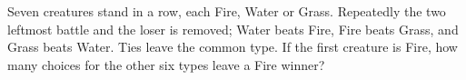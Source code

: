 Seven creatures stand in a row, each Fire, Water or Grass. Repeatedly the two leftmost battle and the loser is removed; Water beats Fire, Fire beats Grass, and Grass beats Water. Ties leave the common type. If the first creature is Fire, how many choices for the other six types leave a Fire winner?
